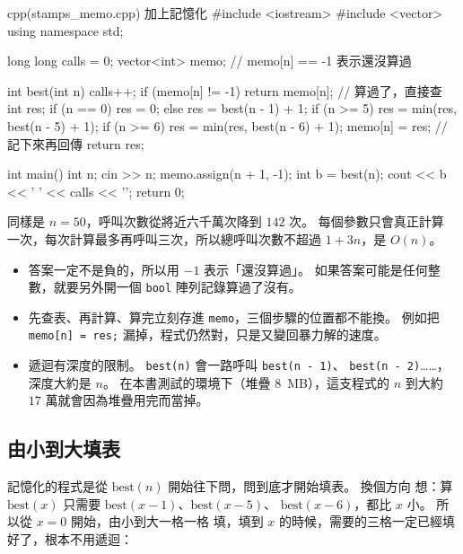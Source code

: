\begin{example}[label=ex:stamps-memo]{cpp}{(stamps\_memo.cpp) 加上記憶化}
#include <iostream>
#include <vector>
using namespace std;

long long calls = 0;
vector<int> memo;                     // memo[n] == -1 表示還沒算過

int best(int n) {
    calls++;
    if (memo[n] != -1) {
        return memo[n];               // 算過了，直接查
    }
    int res;
    if (n == 0) {
        res = 0;
    } else {
        res = best(n - 1) + 1;
        if (n >= 5) {
            res = min(res, best(n - 5) + 1);
        }
        if (n >= 6) {
            res = min(res, best(n - 6) + 1);
        }
    }
    memo[n] = res;                    // 記下來再回傳
    return res;
}

int main() {
    int n;
    cin >> n;
    memo.assign(n + 1, -1);
    int b = best(n);
    cout << b << ' ' << calls << '\n';
    return 0;
}
\end{example}


同樣是 $n = 50$，呼叫次數從將近六千萬次降到 $142$ 次。 每個參數只會真正計算
一次，每次計算最多再呼叫三次，所以總呼叫次數不超過 $1 + 3n$，是 $O(n)$。

\begin{itemize}
\item 答案一定不是負的，所以用 $-1$ 表示「還沒算過」。 如果答案可能是任何整
數，就要另外開一個 \texttt{bool} 陣列記錄算過了沒有。
\item 先查表、再計算、算完立刻存進 \texttt{memo}，三個步驟的位置都不能換。
例如把 \texttt{memo[n] = res;} 漏掉，程式仍然對，只是又變回暴力解的速度。
\item 遞迴有深度的限制。 \texttt{best(n)} 會一路呼叫 \texttt{best(n - 1)}、
\texttt{best(n - 2)}……，深度大約是 $n$。 在本書測試的環境下（堆疊
$8$~MB），這支程式的 $n$ 到大約 $17$ 萬就會因為堆疊用完而當掉。
\end{itemize}

\subsection{由小到大填表}

記憶化的程式是從 $\mathrm{best}(n)$ 開始往下問，問到底才開始填表。 換個方向
想：算 $\mathrm{best}(x)$ 只需要 $\mathrm{best}(x - 1)$、$\mathrm{best}(x - 5)$、
$\mathrm{best}(x - 6)$，都比 $x$ 小。 所以從 $x = 0$ 開始，由小到大一格一格
填，填到 $x$ 的時候，需要的三格一定已經填好了，根本不用遞迴：

